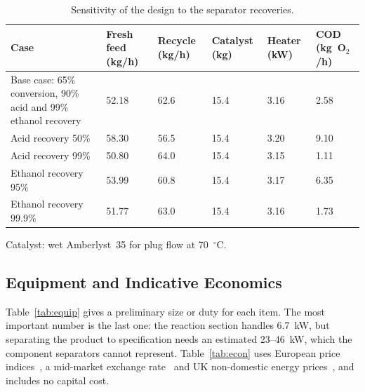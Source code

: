 \documentclass[10pt,a4paper]{article}
\newcommand{\hdrrow}{}
\newcommand{\tabnote}[1]{\par\vspace{2pt}\begin{minipage}{\textwidth}\justifying\footnotesize #1\end{minipage}}
\begin{document}
\begin{table}[H]
\centering
\caption{Sensitivity of the design to the separator recoveries.}
\label{tab:sens}
\small
\begin{tabularx}{\textwidth}{|Y|R{1.7cm}|R{1.4cm}|R{1.4cm}|R{1.4cm}|R{1.8cm}|}
\hline
\hdrrow
\textbf{Case} & \textbf{Fresh feed (kg/h)} & \textbf{Recycle (kg/h)} & \textbf{Catalyst (kg)} & \textbf{Heater (kW)} & \textbf{COD (kg~O$_2$/h)} \\
\hline
Base case: 65\% conversion, 90\% acid and 99\% ethanol recovery & 52.18 & 62.6 & 15.4 & 3.16 & 2.58 \\
\hline
Acid recovery 50\% & 58.30 & 56.5 & 15.4 & 3.20 & 9.10 \\
\hline
Acid recovery 99\% & 50.80 & 64.0 & 15.4 & 3.15 & 1.11 \\
\hline
Ethanol recovery 95\% & 53.99 & 60.8 & 15.4 & 3.17 & 6.35 \\
\hline
Ethanol recovery 99.9\% & 51.77 & 63.0 & 15.4 & 3.16 & 1.73 \\
\hline
\end{tabularx}
\tabnote{Catalyst: wet Amberlyst~35 for plug flow at 70~$^\circ$C.}
\end{table}

\subsection{Equipment and Indicative Economics}
\label{sec:equip_econ}

Table~\ref{tab:equip} gives a preliminary size or duty for each item. The most important number is the last one: the reaction section handles 6.7~kW, but separating the product to specification needs an estimated 23--46~kW, which the component separators cannot represent. Table~\ref{tab:econ} uses European price indices~\cite{ref18}, a mid-market exchange rate~\cite{ref19} and UK non-domestic energy prices~\cite{ref20}, and includes no capital cost.
\end{document}
